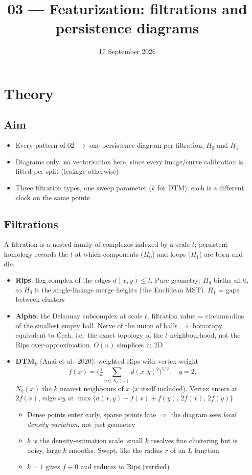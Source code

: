 \documentclass[11pt]{article}
\title{03 --- Featurization: filtrations and persistence diagrams}
\date{17 September 2026}
\begin{document}
\maketitle

\section{Theory}

\subsection*{Aim}
\begin{itemize}
  \item Every pattern of 02 $\to$ one persistence diagram per filtration, $H_0$ and $H_1$
  \item Diagrams only: no vectorisation here, since every image/curve calibration is fitted per split (leakage otherwise)
  \item Three filtration types, one sweep parameter ($k$ for DTM); each is a different clock on the same points
\end{itemize}

\subsection*{Filtrations}
A filtration is a nested family of complexes indexed by a scale $t$; persistent homology records the $t$ at which components ($H_0$) and loops ($H_1$) are born and die.
\begin{itemize}
  \item \textbf{Rips}: flag complex of the edges $d(x,y)\le t$. Pure geometry; $H_0$ births all $0$, so $H_0$ is the single-linkage merge heights (the Euclidean MST). $H_1$ = gaps between clusters
  \item \textbf{Alpha}: the Delaunay subcomplex at scale $t$, filtration value = circumradius of the smallest empty ball. Nerve of the union of balls $\Rightarrow$ homotopy equivalent to \v{C}ech, i.e.\ the exact topology of the $t$-neighbourhood, not the Rips over-approximation. $O(n)$ simplices in 2D
  \item \textbf{DTM$_k$} (Anai et al.\ 2020): weighted Rips with vertex weight
  \[
    f(x) = \Big(\tfrac1k\textstyle\sum_{y\in N_k(x)} d(x,y)^q\Big)^{1/q}, \quad q = 2,
  \]
  $N_k(x)$ the $k$ nearest neighbours of $x$ ($x$ itself included). Vertex enters at $2f(x)$, edge $xy$ at $\max\{d(x,y)+f(x)+f(y),\,2f(x),\,2f(y)\}$
  \begin{itemize}
    \item Dense points enter early, sparse points late $\Rightarrow$ the diagram sees \emph{local density variation}, not just geometry
    \item $k$ is the density-estimation scale: small $k$ resolves fine clustering but is noisy, large $k$ smooths. Swept, like the radius $r$ of an $L$ function
    \item $k=1$ gives $f\equiv0$ and reduces to Rips (verified)
  \end{itemize}
\end{itemize}
\end{document}
